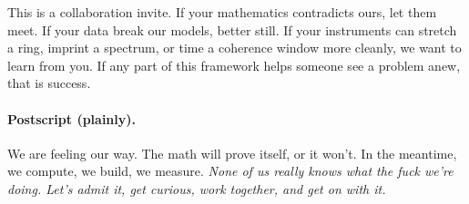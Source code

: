 \documentclass[11pt]{article}
\begin{document}
This is a collaboration invite. If your mathematics contradicts ours, let them meet.
If your data break our models, better still. If your instruments can stretch a ring,
imprint a spectrum, or time a coherence window more cleanly, we want to learn from you.
If any part of this framework helps someone see a problem anew, that is success.

\paragraph*{Postscript (plainly).}
We are feeling our way. The math will prove itself, or it won’t. In the meantime, we compute, we build, we measure.
\emph{None of us really knows what the fuck we’re doing. Let’s admit it, get curious, work together, and get on with it.}
\end{document}
